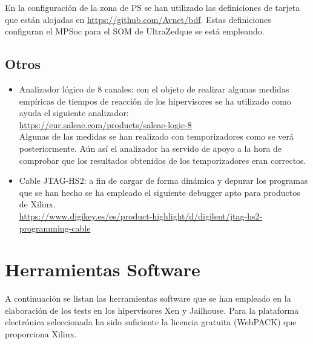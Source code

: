 En la configuración de la zona de PS se han utilizado las definiciones de tarjeta que están alojadas en \url{https://github.com/Avnet/bdf}. Estas definiciones configuran el MPSoc para el \acrshort{SOM} de UltraZed\texttrademark que se está empleando.

\subsection{Otros}

\begin{itemize}
  \item Analizador lógico de 8 canales: con el objeto de realizar algunas medidas empíricas de tiempos de reacción de los hipervisores se ha utilizado como ayuda el siguiente analizador:\\
  \url{https://eur.saleae.com/products/saleae-logic-8}
  \\Algunas de las medidas se han realizado con temporizadores como se verá posteriormente. Aún así el analizador ha servido de apoyo a la hora de comprobar que los resultados obtenidos de los temporizadores eran correctos.
  \item Cable JTAG-HS2: a fin de cargar de forma dinámica y depurar los programas que se han hecho se ha empleado el siguiente debugger apto para productos de Xilinx.\\

  \url{https://www.digikey.es/es/product-highlight/d/digilent/jtag-hs2-programming-cable}
\end{itemize}

\section{Herramientas Software}

A continuación se listan las herramientas software que se han empleado en la elaboración de los tests en los hipervisores Xen y Jailhouse. Para la plataforma electrónica seleccionada ha sido suficiente la licencia gratuita (WebPACK) que proporciona Xilinx.

